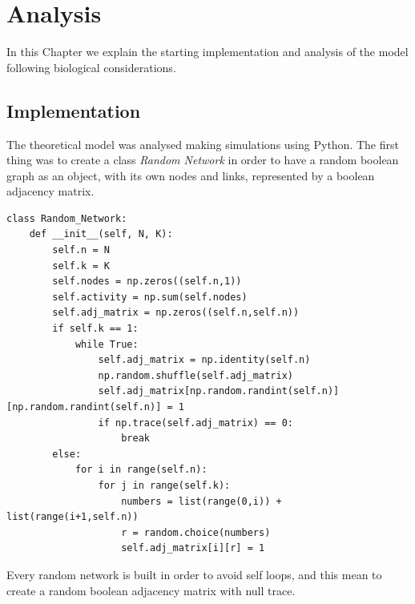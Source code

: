 \chapter{Analysis}\label{analysis}
\lhead[\fancyplain{}{\bfseries\thepage}]{\fancyplain{}{\bfseries\rightmark}}

In this Chapter we explain the starting implementation and analysis of the model following biological considerations.

\section{Implementation}

The theoretical model was analysed making simulations using Python.
The first thing was to create a class \emph{Random Network} in order to have a random boolean graph as an object, with its own nodes and links, represented by a boolean adjacency matrix.

\begin{verbatim}
class Random_Network:
    def __init__(self, N, K):
        self.n = N
        self.k = K
        self.nodes = np.zeros((self.n,1))
        self.activity = np.sum(self.nodes)
        self.adj_matrix = np.zeros((self.n,self.n))
        if self.k == 1:
            while True:
                self.adj_matrix = np.identity(self.n)
                np.random.shuffle(self.adj_matrix)
                self.adj_matrix[np.random.randint(self.n)][np.random.randint(self.n)] = 1
                if np.trace(self.adj_matrix) == 0:
                    break
        else:
            for i in range(self.n):
                for j in range(self.k):
                    numbers = list(range(0,i)) + list(range(i+1,self.n))
                    r = random.choice(numbers)
                    self.adj_matrix[i][r] = 1
\end{verbatim}

Every random network is built in order to avoid self loops, and this mean to create a random boolean adjacency matrix with null trace.

